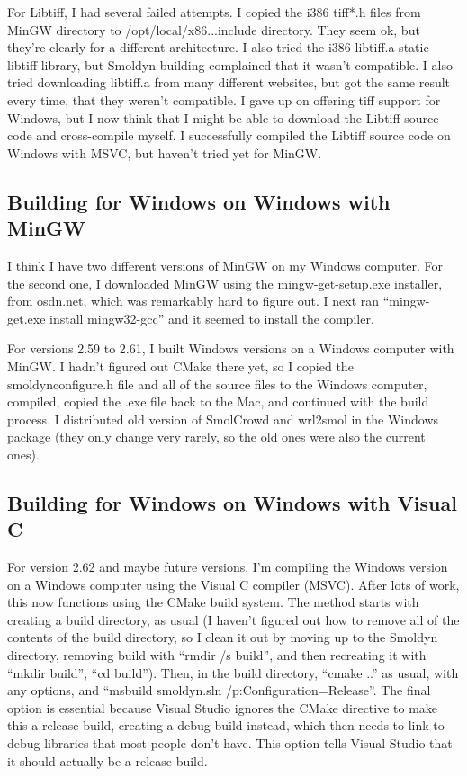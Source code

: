 \documentclass {scrbook}
\begin{document}
For Libtiff, I had several failed attempts. I copied the i386 tiff*.h files from MinGW directory to /opt/local/x86...include directory. They seem ok, but they're clearly for a different architecture. I also tried the i386 libtiff.a static libtiff library, but Smoldyn building complained that it wasn't compatible. I also tried downloading libtiff.a from many different websites, but got the same result every time, that they weren't compatible. I gave up on offering tiff support for Windows, but I now think that I might be able to download the Libtiff source code and cross-compile myself. I successfully compiled the Libtiff source code on Windows with MSVC, but haven't tried yet for MinGW.


\subsection{Building for Windows on Windows with MinGW}

I think I have two different versions of MinGW on my Windows computer. For the second one, I downloaded MinGW using the mingw-get-setup.exe installer, from osdn.net, which was remarkably hard to figure out. I next ran ``mingw-get.exe install mingw32-gcc'' and it seemed to install the compiler.

For versions 2.59 to 2.61, I built Windows versions on a Windows computer with MinGW. I hadn't figured out CMake there yet, so I copied the smoldynconfigure.h file and all of the source files to the Windows computer, compiled, copied the .exe file back to the Mac, and continued with the build process. I distributed old version of SmolCrowd and wrl2smol in the Windows package (they only change very rarely, so the old ones were also the current ones).

\subsection{Building for Windows on Windows with Visual C}

For version 2.62 and maybe future versions, I'm compiling the Windows version on a Windows computer using the Visual C compiler (MSVC). After lots of work, this now functions using the CMake build system. The method starts with creating a build directory, as usual (I haven't figured out how to remove all of the contents of the build directory, so I clean it out by moving up to the Smoldyn directory, removing build with ``rmdir /s build'', and then recreating it with ``mkdir build'', ``cd build''). Then, in the build directory, ``cmake ..'' as usual, with any options, and ``msbuild smoldyn.sln /p:Configuration=Release''. The final option is essential because Visual Studio ignores the CMake directive to make this a release build, creating a debug build instead, which then needs to link to debug libraries that most people don't have. This option tells Visual Studio that it should actually be a release build.
\end{document}
